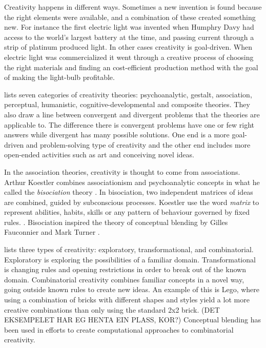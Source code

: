 Creativity happens in different ways. Sometimes a new invention is found because the right elements were available, and a combination of these created something new. For instance the first electric light was invented when Humphry Davy had access to the world's largest battery at the time, and passing current through a strip of platinum produced light. In other cases creativity is goal-driven. When electric light was commercialized it went through a creative process of choosing the right materials and finding an cost-efficient production method with the goal of making the light-bulb profitable.

\citet{busse1980theories} lists seven categories of creativity theories: psychoanalytic, gestalt, association, perceptual, humanistic, cognitive-developmental and composite theories.
They also draw a line between convergent and divergent problems that the theories are applicable to. The difference there is convergent problems have one or few right answers while divergent has many possible solutions. One end is a more goal-driven and problem-solving type of creativity and the other end includes more open-ended activities such as art and conceiving novel ideas.

In the association theories, creativity is thought to come from associations.
Arthur Koestler combines associationism and psychoanalytic concepts in what he called the \emph{bisociation} theory \parencite{busse1980theories}.
In bisociation, two independent matrices of ideas are combined, guided by subconscious processes.
Koestler use the word \emph{matrix} to represent abilities, habits, skills or any pattern of behaviour governed by fixed rules. \parencite{koestler1964act}.
Bisociation inspired the theory of conceptual blending by Gilles Fauconnier and Mark Turner \parencite{fauconnier2002way}.

\citet{boden2004creative} lists three types of creativity: exploratory, transformational, and combinatorial. Exploratory is exploring the possibilities of a familiar domain. Transformational is changing rules and opening restrictions in order to break out of the known domain. Combinatorial creativity combines familiar concepts in a novel way, going outside known rules to create new ideas. An example of this is Lego, where using a combination of bricks with different shapes and styles yield a lot more creative combinations than only using the standard 2x2 brick. (DET EKSEMPELET HAR EG HENTA EIN PLASS, KOR?) Conceptual blending has been used in efforts to create computational approaches to combinatorial creativity.

